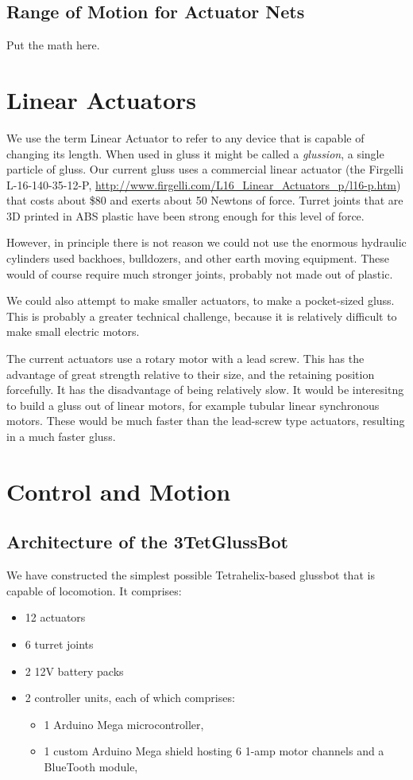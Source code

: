 \documentclass[12pt]{article}
\begin{document}
\subsection{Range of Motion for Actuator Nets}

Put the math here.

\section{Linear Actuators}

We use the term Linear Actuator to refer to any device that is capable of changing its length. When
used in gluss it might be called a \emph{glussion}, a single particle of gluss. Our current gluss
uses a commercial linear actuator (the Firgelli L-16-140-35-12-P, \url{http://www.firgelli.com/L16_Linear_Actuators_p/l16-p.htm}) that costs about \$80 and exerts about 50 Newtons of force.
Turret joints that are 3D printed in ABS plastic have been strong enough for this level of force.

However, in principle there is not reason we could not use the enormous hydraulic cylinders
used backhoes, bulldozers, and other earth moving equipment. These would of course require much
stronger joints, probably not made out of plastic.

We could also attempt to make smaller actuators, to make a pocket-sized gluss. This is probably
a greater technical challenge, because it is relatively difficult to make small electric motors.

The current actuators use a rotary motor with a lead screw. This has the advantage of great
strength relative to their size, and the retaining position forcefully. It has the disadvantage
of being relatively slow. It would be interesitng to build a gluss out of linear motors, for
example tubular linear synchronous motors. These would be much faster than the lead-screw type
actuators, resulting in a much faster gluss. 

\section{Control and Motion}
\subsection{Architecture of the 3TetGlussBot}

We have constructed the simplest possible Tetrahelix-based glussbot that is capable of locomotion.
It comprises:
\begin{itemize}  
\item 12 actuators
\item 6 turret joints
\item 2 12V battery packs
\item 2 controller units, each of which comprises:
\begin{itemize}  
\item 1 Arduino Mega microcontroller,
\item 1 custom Arduino Mega shield hosting 6 1-amp motor channels and a BlueTooth module,
\end{itemize}  
\end{itemize}
\end{document}
